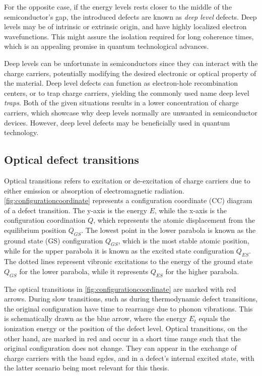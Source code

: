 For the opposite case, if the energy levels rests closer to the middle of the semiconductor's gap, the introduced defects are known as \textit{deep level} defects. Deep levels may be of intrinsic or extrinsic origin, %
and have highly localized electron wavefunctions. This might assure the isolation required for long coherence times, which is an appealing promise in quantum technological advances.

Deep levels can be unfortunate in semiconductors since they can interact with the charge carriers, potentially modifying the desired electronic or optical property of the material. Deep level defects can function as electron-hole recombination centers, or to trap charge carriers, yielding the commonly used name deep level \textit{traps}. Both of the given situations results in a lower concentration of charge carriers, which showcase why deep levels normally are unwanted in semiconductor devices. However, deep level defects may be beneficially used in quantum technology. %

\subsection{Optical defect transitions}

Optical transitions refers to excitation or de-excitation of charge carriers due to either emission or absorption of electromagnetic radiation.%
\autoref{fig:configurationcoordinate} represents a configuration coordinate (CC) diagram of a defect transition. The y-axis is the energy $E$, while the x-axis is the configuration coordination $Q$, which represents the atomic displacement from the equilibrium position $Q_{GS}$. The lowest point in the lower parabola is known as the ground state (GS) configuration $Q_{GS}$, which is the most stable atomic position, while for the upper parabola it is known as the excited state configuration $Q_{ES}$. The dotted lines represent vibronic excitations to the energy of the ground state $Q_{GS}$ for the lower parabola, while it represents $Q_{ES}$ for the higher parabola.



\noindent The optical transitions in \autoref{fig:configurationcoordinate} are marked with red arrows. During slow transitions, such as during thermodynamic defect transitions, the original configuration have time to rearrange due to phonon vibrations. This is schematically drawn as the blue arrow, where the energy $E_t$ equals the ionization energy or the position of the defect level. Optical transitions, on the other hand, are marked in red and occur in a short time range such that the original configuration does not change. They can appear in the exchange of charge carriers with the band egdes, and in a defect's internal excited state, with the latter scenario being most relevant for this thesis.

